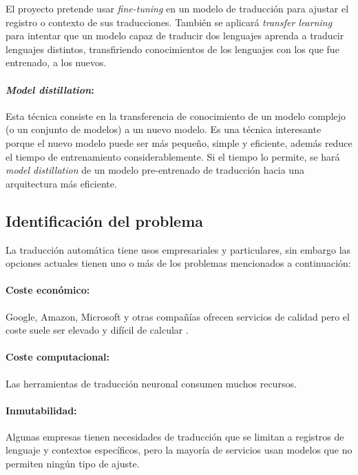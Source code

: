 El proyecto pretende usar \textit{fine-tuning} en un modelo de traducción para ajustar el registro
o contexto de sus traducciones. También se aplicará \textit{transfer learning} para intentar que un modelo
capaz de traducir dos lenguajes aprenda a traducir lenguajes distintos, transfiriendo conocimientos de los
lenguajes con los que fue entrenado, a los nuevos.

\paragraph{\textit{Model distillation}:}
Esta técnica consiste en la transferencia de conocimiento de un modelo complejo (o un conjunto de modelos)
a un nuevo modelo.
Es una técnica interesante porque el nuevo modelo puede ser más pequeño, simple y eficiente,
además reduce el tiempo de entrenamiento considerablemente.
Si el tiempo lo permite, se hará \textit{model distillation} de un modelo pre-entrenado de traducción
hacia una arquitectura más eficiente.




\subsection{Identificación del problema}\label{problem}
La traducción automática tiene usos empresariales y particulares, sin embargo las opciones
actuales tienen uno o más de los problemas mencionados a continuación:

\paragraph{Coste económico:}
Google, Amazon, Microsoft y otras compañías ofrecen servicios de calidad pero el coste
suele ser elevado y difícil de calcular
\cite{GoogleTranslatePricing,AWSTranslatePricing,MicrosoftTranslatePricing}.

\paragraph{Coste computacional:}
Las herramientas de traducción neuronal consumen muchos recursos.

\paragraph{Inmutabilidad:}
Algunas empresas tienen necesidades de traducción que se limitan a registros de
lenguaje y contextos específicos, pero la mayoría de servicios usan modelos que no
permiten ningún tipo de ajuste.

